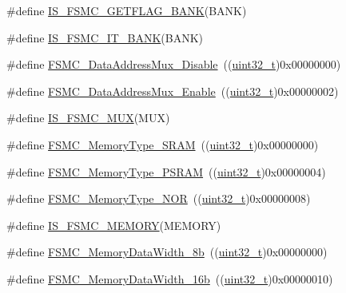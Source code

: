 \begin{DoxyCompactItemize}
\item 
\#define \hyperlink{group___f_s_m_c___exported___constants_ga884e28a365a738ad8a3199ee279a1f77}{I\+S\+\_\+\+F\+S\+M\+C\+\_\+\+G\+E\+T\+F\+L\+A\+G\+\_\+\+B\+A\+NK}(B\+A\+NK)
\item 
\#define \hyperlink{group___f_s_m_c___exported___constants_gaca216ea0c184b78f23df15296a10bac0}{I\+S\+\_\+\+F\+S\+M\+C\+\_\+\+I\+T\+\_\+\+B\+A\+NK}(B\+A\+NK)
\item 
\#define \hyperlink{group___f_s_m_c___data___address___bus___multiplexing_ga62d92adbcbcc1d6ec9a04de1b343744a}{F\+S\+M\+C\+\_\+\+Data\+Address\+Mux\+\_\+\+Disable}~((\hyperlink{_p_e___types_8h_a33594304e786b158f3fb30289278f5af}{uint32\+\_\+t})0x00000000)
\item 
\#define \hyperlink{group___f_s_m_c___data___address___bus___multiplexing_ga1dd4d12e63aaf29dbb8ae4b613f2aa15}{F\+S\+M\+C\+\_\+\+Data\+Address\+Mux\+\_\+\+Enable}~((\hyperlink{_p_e___types_8h_a33594304e786b158f3fb30289278f5af}{uint32\+\_\+t})0x00000002)
\item 
\#define \hyperlink{group___f_s_m_c___data___address___bus___multiplexing_ga546fcab8c1b751b4a959ba2ce5b35d79}{I\+S\+\_\+\+F\+S\+M\+C\+\_\+\+M\+UX}(M\+UX)
\item 
\#define \hyperlink{group___f_s_m_c___memory___type_ga8a24e8da42e67dcf6fb2f43659aa49cf}{F\+S\+M\+C\+\_\+\+Memory\+Type\+\_\+\+S\+R\+AM}~((\hyperlink{_p_e___types_8h_a33594304e786b158f3fb30289278f5af}{uint32\+\_\+t})0x00000000)
\item 
\#define \hyperlink{group___f_s_m_c___memory___type_gae3e680998b2fee8d56222634f5268a75}{F\+S\+M\+C\+\_\+\+Memory\+Type\+\_\+\+P\+S\+R\+AM}~((\hyperlink{_p_e___types_8h_a33594304e786b158f3fb30289278f5af}{uint32\+\_\+t})0x00000004)
\item 
\#define \hyperlink{group___f_s_m_c___memory___type_ga8b9390abe7c281947c550bf4365649e5}{F\+S\+M\+C\+\_\+\+Memory\+Type\+\_\+\+N\+OR}~((\hyperlink{_p_e___types_8h_a33594304e786b158f3fb30289278f5af}{uint32\+\_\+t})0x00000008)
\item 
\#define \hyperlink{group___f_s_m_c___memory___type_ga255cd500e141f4ac024cf5f896921233}{I\+S\+\_\+\+F\+S\+M\+C\+\_\+\+M\+E\+M\+O\+RY}(M\+E\+M\+O\+RY)
\item 
\#define \hyperlink{group___f_s_m_c___data___width_ga5753e089830f19af70a724766e3c329f}{F\+S\+M\+C\+\_\+\+Memory\+Data\+Width\+\_\+8b}~((\hyperlink{_p_e___types_8h_a33594304e786b158f3fb30289278f5af}{uint32\+\_\+t})0x00000000)
\item 
\#define \hyperlink{group___f_s_m_c___data___width_ga65d85c3072e6790ae760ca2248e46df6}{F\+S\+M\+C\+\_\+\+Memory\+Data\+Width\+\_\+16b}~((\hyperlink{_p_e___types_8h_a33594304e786b158f3fb30289278f5af}{uint32\+\_\+t})0x00000010)

\end{DoxyCompactItemize}
